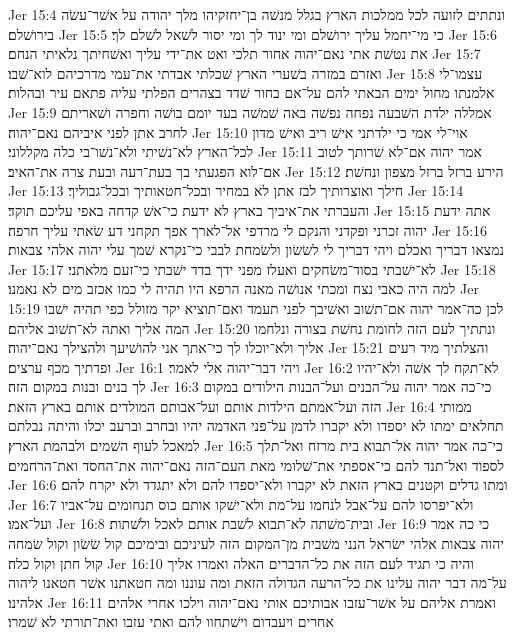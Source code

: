 Jer 15:4  ונתתים לזועה לכל ממלכות הארץ בגלל מנשׁה בן־יחזקיהו מלך יהודה על אשׁר־עשׂה בירושׁלם׃
Jer 15:5  כי מי־יחמל עליך ירושׁלם ומי ינוד לך ומי יסור לשׁאל לשׁלם לך׃
Jer 15:6  את נטשׁת אתי נאם־יהוה אחור תלכי ואט את־ידי עליך ואשׁחיתך נלאיתי הנחם׃
Jer 15:7  ואזרם במזרה בשׁערי הארץ שׁכלתי אבדתי את־עמי מדרכיהם לוא־שׁבו׃
Jer 15:8  עצמו־לי אלמנתו מחול ימים הבאתי להם על־אם בחור שׁדד בצהרים הפלתי עליה פתאם עיר ובהלות׃
Jer 15:9  אמללה ילדת השׁבעה נפחה נפשׁה באה שׁמשׁה בעד יומם בושׁה וחפרה ושׁאריתם לחרב אתן לפני איביהם נאם־יהוה׃
Jer 15:10  אוי־לי אמי כי ילדתני אישׁ ריב ואישׁ מדון לכל־הארץ לא־נשׁיתי ולא־נשׁו־בי כלה מקללוני׃
Jer 15:11  אמר יהוה אם־לא שׁרותך לטוב אם־לוא הפגעתי בך בעת־רעה ובעת צרה את־האיב׃
Jer 15:12  הירע ברזל ברזל מצפון ונחשׁת׃
Jer 15:13  חילך ואוצרותיך לבז אתן לא במחיר ובכל־חטאותיך ובכל־גבוליך׃
Jer 15:14  והעברתי את־איביך בארץ לא ידעת כי־אשׁ קדחה באפי עליכם תוקד׃
Jer 15:15  אתה ידעת יהוה זכרני ופקדני והנקם לי מרדפי אל־לארך אפך תקחני דע שׂאתי עליך חרפה׃
Jer 15:16  נמצאו דבריך ואכלם ויהי דבריך לי לשׂשׂון ולשׂמחת לבבי כי־נקרא שׁמך עלי יהוה אלהי צבאות׃
Jer 15:17  לא־ישׁבתי בסוד־משׂחקים ואעלז מפני ידך בדד ישׁבתי כי־זעם מלאתני׃
Jer 15:18  למה היה כאבי נצח ומכתי אנושׁה מאנה הרפא היו תהיה לי כמו אכזב מים לא נאמנו׃
Jer 15:19  לכן כה־אמר יהוה אם־תשׁוב ואשׁיבך לפני תעמד ואם־תוציא יקר מזולל כפי תהיה ישׁבו המה אליך ואתה לא־תשׁוב אליהם׃
Jer 15:20  ונתתיך לעם הזה לחומת נחשׁת בצורה ונלחמו אליך ולא־יוכלו לך כי־אתך אני להושׁיעך ולהצילך נאם־יהוה׃
Jer 15:21  והצלתיך מיד רעים ופדתיך מכף ערצים׃
Jer 16:1  ויהי דבר־יהוה אלי לאמר׃
Jer 16:2  לא־תקח לך אשׁה ולא־יהיו לך בנים ובנות במקום הזה׃
Jer 16:3  כי־כה אמר יהוה על־הבנים ועל־הבנות הילודים במקום הזה ועל־אמתם הילדות אותם ועל־אבותם המולדים אותם בארץ הזאת׃
Jer 16:4  ממותי תחלאים ימתו לא יספדו ולא יקברו לדמן על־פני האדמה יהיו ובחרב וברעב יכלו והיתה נבלתם למאכל לעוף השׁמים ולבהמת הארץ׃
Jer 16:5  כי־כה אמר יהוה אל־תבוא בית מרזח ואל־תלך לספוד ואל־תנד להם כי־אספתי את־שׁלומי מאת העם־הזה נאם־יהוה את־החסד ואת־הרחמים׃
Jer 16:6  ומתו גדלים וקטנים בארץ הזאת לא יקברו ולא־יספדו להם ולא יתגדד ולא יקרח להם׃
Jer 16:7  ולא־יפרסו להם על־אבל לנחמו על־מת ולא־ישׁקו אותם כוס תנחומים על־אביו ועל־אמו׃
Jer 16:8  ובית־משׁתה לא־תבוא לשׁבת אותם לאכל ולשׁתות׃
Jer 16:9  כי כה אמר יהוה צבאות אלהי ישׂראל הנני משׁבית מן־המקום הזה לעיניכם ובימיכם קול שׂשׂון וקול שׂמחה קול חתן וקול כלה׃
Jer 16:10  והיה כי תגיד לעם הזה את כל־הדברים האלה ואמרו אליך על־מה דבר יהוה עלינו את כל־הרעה הגדולה הזאת ומה עוננו ומה חטאתנו אשׁר חטאנו ליהוה אלהינו׃
Jer 16:11  ואמרת אליהם על אשׁר־עזבו אבותיכם אותי נאם־יהוה וילכו אחרי אלהים אחרים ויעבדום וישׁתחוו להם ואתי עזבו ואת־תורתי לא שׁמרו׃
